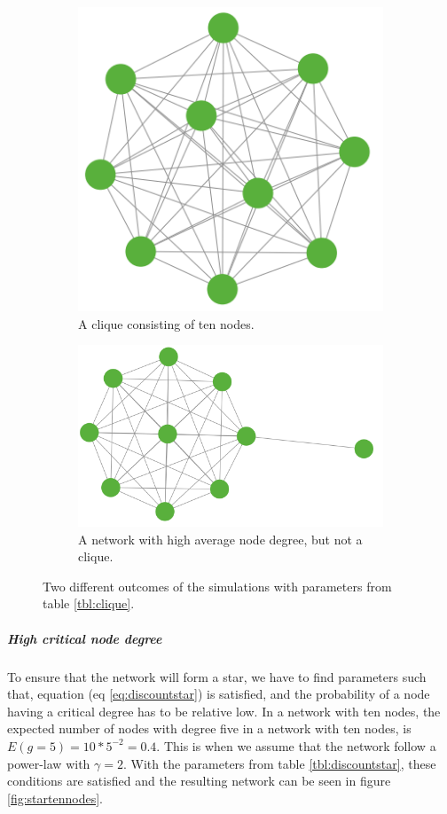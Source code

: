 \begin{figure}[h]
\centering
\begin{subfigure}{.5\textwidth}
  \centering
  \includegraphics[width=0.4\linewidth]{../Figures/discount/cliquetennodes.png}
  \caption{\label{fig:discountclique} A clique consisting of ten nodes. }
\end{subfigure}
\quad
\begin{subfigure}{.46\textwidth}
  \centering
  \includegraphics[width=0.8\linewidth]{../Figures/discount/baloontennodes.png}
  \caption{\label{fig:discountbaloon} A network with high average node degree, but not a clique.}
\end{subfigure}
\caption{\label{fig:discounthighdegree} Two different outcomes of the simulations with parameters from table \ref{tbl:clique}.}
\end{figure}

\subparagraph{High critical node degree}
To ensure that the network will form a star, we have to find parameters such that, equation (eq \ref{eq:discountstar}) is satisfied, and the probability of a node having a critical degree has to be relative low. In a network with ten nodes, the expected number of nodes with degree five in a network with ten nodes, is $E(g=5)=10*5^{-2}=0.4$. This is when we assume that the network follow a power-law with $\gamma=2$. With the parameters from table \ref{tbl:discountstar}, these conditions are satisfied and the resulting network can be seen in figure \ref{fig:startennodes}.
  
